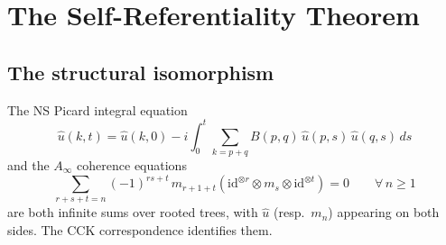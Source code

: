 \documentclass[reqno,10pt]{amsart}
\theoremstyle{plain}
\theoremstyle{definition}
\begin{document}
\section{The Self-Referentiality Theorem}\label{sec:selfreferential}

\subsection{The structural isomorphism}

The NS Picard integral equation
\begin{equation}\label{eq:picard}
  \hat{u}(k,t) = \hat{u}(k,0) - i\int_0^t \sum_{k=p+q} B(p,q)\,
  \hat{u}(p,s)\,\hat{u}(q,s)\,ds
\end{equation}
and the $A_\infty$ coherence equations
\begin{equation}\label{eq:ainf}
  \sum_{r+s+t=n} (-1)^{rs+t}\, m_{r+1+t}(\mathrm{id}^{\otimes r}
  \otimes m_s \otimes \mathrm{id}^{\otimes t}) = 0 \qquad \forall\,n\geq 1
\end{equation}
are both infinite sums over rooted trees, with $\hat{u}$ (resp.\ $m_n$)
appearing on both sides.  The CCK correspondence identifies them.
\end{document}

